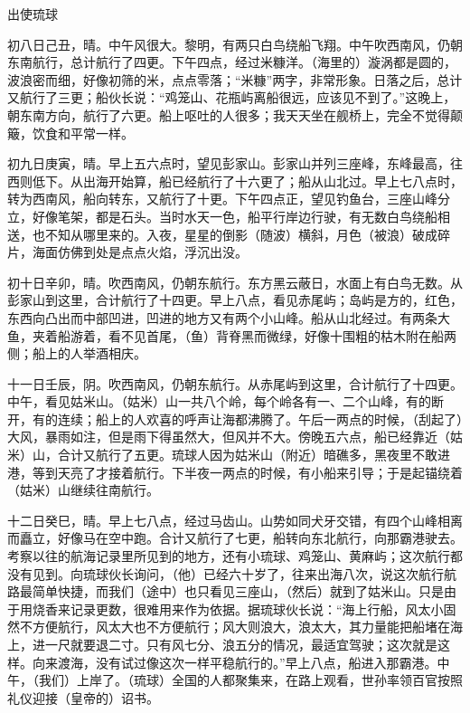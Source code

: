 \documentclass[12pt,UTF-8,openany]{ctexbook}
\begin{document}
\begin{normalsize}
    
    出使琉球
    
    初八日己丑，晴。中午风很大。黎明，有两只白鸟绕船飞翔。中午吹西南风，仍朝东南航行，总计航行了四更。下午四点，经过米糠洋。（海里的）漩涡都是圆的，波浪密而细，好像初筛的米，点点零落；“米糠”两字，非常形象。日落之后，总计又航行了三更；船伙长说：“鸡笼山、花瓶屿离船很远，应该见不到了。”这晚上，朝东南方向，航行了六更。船上呕吐的人很多；我天天坐在舰桥上，完全不觉得颠簸，饮食和平常一样。
    
    初九日庚寅，晴。早上五六点时，望见彭家山。彭家山并列三座峰，东峰最高，往西则低下。从出海开始算，船已经航行了十六更了；船从山北过。早上七八点时，转为西南风，船向转东，又航行了十更。下午四点正，望见钓鱼台，三座山峰分立，好像笔架，都是石头。当时水天一色，船平行岸边行驶，有无数白鸟绕船相送，也不知从哪里来的。入夜，星星的倒影（随波）横斜，月色（被浪）破成碎片，海面仿佛到处是点点火焰，浮沉出没。
    
    初十日辛卯，晴。吹西南风，仍朝东航行。东方黑云蔽日，水面上有白鸟无数。从彭家山到这里，合计航行了十四更。早上八点，看见赤尾屿；岛屿是方的，红色，东西向凸出而中部凹进，凹进的地方又有两个小山峰。船从山北经过。有两条大鱼，夹着船游着，看不见首尾，（鱼）背脊黑而微绿，好像十围粗的枯木附在船两侧；船上的人举酒相庆。
    
    十一日壬辰，阴。吹西南风，仍朝东航行。从赤尾屿到这里，合计航行了十四更。中午，看见姑米山。（姑米）山一共八个岭，每个岭各有一、二个山峰，有的断开，有的连续；船上的人欢喜的呼声让海都沸腾了。午后一两点的时候，（刮起了）大风，暴雨如注，但是雨下得虽然大，但风并不大。傍晚五六点，船已经靠近（姑米）山，合计又航行了五更。琉球人因为姑米山（附近）暗礁多，黑夜里不敢进港，等到天亮了才接着航行。下半夜一两点的时候，有小船来引导；于是起锚绕着（姑米）山继续往南航行。
    
    十二日癸巳，晴。早上七八点，经过马齿山。山势如同犬牙交错，有四个山峰相离而矗立，好像马在空中跑。合计又航行了七更，船转向东北航行，向那霸港驶去。考察以往的航海记录里所见到的地方，还有小琉球、鸡笼山、黄麻屿；这次航行都没有见到。向琉球伙长询问，（他）已经六十岁了，往来出海八次，说这次航行航路最简单快捷，而我们（途中）也只看见三座山，（然后）就到了姑米山。只是由于用烧香来记录更数，很难用来作为依据。据琉球伙长说：“海上行船，风太小固然不方便航行，风太大也不方便航行；风大则浪大，浪太大，其力量能把船堵在海上，进一尺就要退二寸。只有风七分、浪五分的情况，最适宜驾驶；这次就是这样。向来渡海，没有试过像这次一样平稳航行的。”早上八点，船进入那霸港。中午，（我们）上岸了。（琉球）全国的人都聚集来，在路上观看，世孙率领百官按照礼仪迎接（皇帝的）诏书。
    

\end{normalsize}
\end{document}
